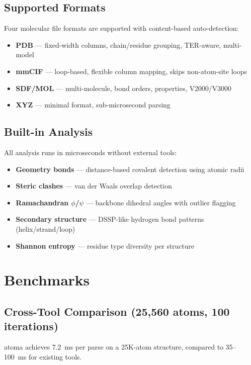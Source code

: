 \documentclass[10pt,conference]{IEEEtran}
\begin{document}
\subsection{Supported Formats}
Four molecular file formats are supported with content-based auto-detection:

\begin{itemize}
  \item \textbf{PDB} --- fixed-width columns, chain/residue grouping, TER-aware, multi-model
  \item \textbf{mmCIF} --- loop-based, flexible column mapping, skips non-atom-site loops
  \item \textbf{SDF/MOL} --- multi-molecule, bond orders, properties, V2000/V3000
  \item \textbf{XYZ} --- minimal format, sub-microsecond parsing
\end{itemize}

\subsection{Built-in Analysis}
All analysis runs in microseconds without external tools:
\begin{itemize}
  \item \textbf{Geometry bonds} --- distance-based covalent detection using atomic radii
  \item \textbf{Steric clashes} --- van der Waals overlap detection
  \item \textbf{Ramachandran $\phi$/$\psi$} --- backbone dihedral angles with outlier flagging
  \item \textbf{Secondary structure} --- DSSP-like hydrogen bond patterns (helix/strand/loop)
  \item \textbf{Shannon entropy} --- residue type diversity per structure
\end{itemize}

\section{Benchmarks}

\subsection{Cross-Tool Comparison (25,560 atoms, 100 iterations)}
atoma achieves 7.2~ms per parse on a 25K-atom structure, compared to 35--100~ms for existing tools.
\end{document}
